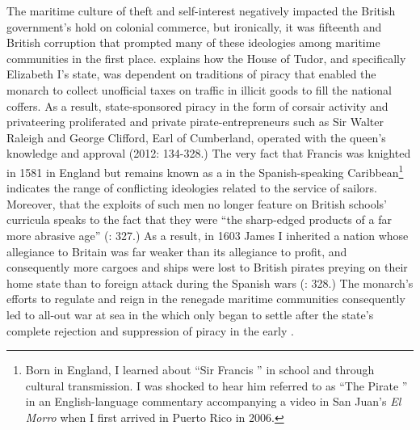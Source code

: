 The maritime culture of theft and self-interest negatively impacted the British government’s hold on colonial commerce, but ironically, it was fifteenth and  British corruption that prompted many of these ideologies among maritime communities in the first place. \citeauthor{Bicheno2012} explains how the House of Tudor, and specifically Elizabeth I’s state, was dependent on traditions of piracy that enabled the monarch to collect unofficial taxes on traffic in illicit goods to fill the national coffers. As a result,  state-sponsored piracy in the form of corsair activity and privateering proliferated and private pirate-entrepreneurs such as Sir Walter Raleigh and George Clifford, Earl of Cumberland, operated with the queen’s knowledge and approval (2012: 134-328.) The very fact that Francis  was knighted in 1581 in England but remains known as a  in the Spanish-speaking Caribbean\footnote{Born in England, I learned about “Sir Francis ” in school and through cultural transmission. I was shocked to hear him referred to as “The Pirate ” in an English-language commentary accompanying a video in San Juan’s \textit{El Morro} when I first arrived in Puerto Rico in 2006.}  indicates the range of conflicting ideologies related to the service of sailors.  Moreover, that the exploits of such men no longer feature on British schools’ curricula speaks to the fact that they were “the sharp-edged products of a far more abrasive age” (\citealt{Bicheno2012}: 327.) As a result, in 1603 James I inherited a  nation whose allegiance to Britain was far weaker than its allegiance to profit, and consequently more cargoes and ships were lost to British pirates preying on their home state than to foreign attack during the Spanish wars (\citealt{Bicheno2012}: 328.) The monarch’s efforts to regulate and reign in the renegade maritime communities consequently led to all-out war at sea in the  which only began to settle after the state’s complete rejection and suppression of piracy in the early . 

